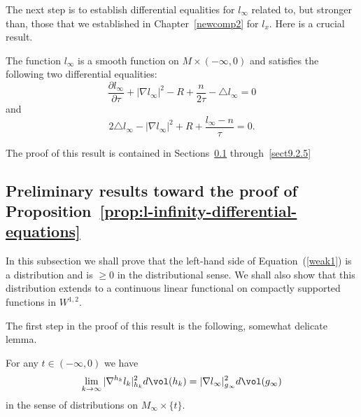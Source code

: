 The next step is to establish differential equalities for $l_\infty$
related to, but stronger than, those that we established in
Chapter~\ref{newcomp2} for $l_x$. Here is a crucial result.

\begin{proposition}\label{prop:l-infinity-differential-equations}
\label{weakeqn}
The function $l_\infty$ is a smooth function
on $M\times (-\infty,0)$ and satisfies the following two
differential equalities: \begin{equation}\label{weak1}
\frac{\partial l_\infty}{\partial \tau}+|\nabla
l_\infty|^2-R+\frac{n}{2\tau}-\triangle l_\infty=0\end{equation}
 and
\begin{equation}\label{weak2}2\triangle l_\infty-|\nabla
l_\infty|^2+R+\frac{l_\infty-n}{\tau}=0.\end{equation}
\end{proposition}

The proof of this result is contained in Sections~\ref{sect9.2.3}
through~\ref{sect9.2.5}

\subsection{Preliminary results toward the proof of
Proposition~{\ref{prop:l-infinity-differential-equations}}}\label{sect9.2.3}

In this subsection we shall prove  that the left-hand side of
Equation~(\ref{weak1}) is a distribution and is $\ge 0$ in the
distributional sense. We shall also show that this distribution
extends to a continuous linear functional on compactly supported
functions in $W^{1,2}$.

 The first step in the proof of
this result is the following, somewhat delicate lemma.

\begin{lemma}\label{lem:gradient-convergence-distributions}
\label{nablaconv}
For any $t\in (-\infty,0)$ we have
$$\lim_{k\rightarrow\infty}|\nabla^{h_k} l_k|_{h_k}^2d\vol(h_k)
=|\nabla l_\infty|_{g_\infty}^2 d\vol(g_\infty)$$ in the sense
of distributions on $M_\infty\times \{t\}$.
\end{lemma}

